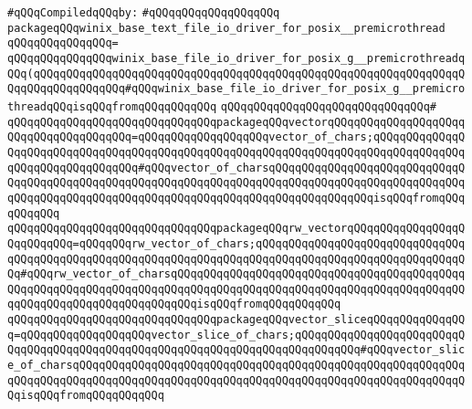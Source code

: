 \newline
\verb|#qQQqCompiledqQQqby:|\newline
\verb|#qQQqqQQqqQQqqQQqqQQq|\newline
\newline
\verb|packageqQQqwinix_base_text_file_io_driver_for_posix__premicrothread|\newline
\verb|qQQqqQQqqQQqqQQq=|\newline
\verb|qQQqqQQqqQQqqQQqwinix_base_file_io_driver_for_posix_g__premicrothreadqQQq(qQQqqQQqqQQqqQQqqQQqqQQqqQQqqQQqqQQqqQQqqQQqqQQqqQQqqQQqqQQqqQQqqQQqqQQqqQQqqQQqqQQq#qQQqwinix_base_file_io_driver_for_posix_g__premicrothreadqQQqisqQQqfromqQQqqQQqqQQq|\newline
\verb|qQQqqQQqqQQqqQQqqQQqqQQqqQQqqQQq#|\newline
\verb|qQQqqQQqqQQqqQQqqQQqqQQqqQQqqQQqpackageqQQqvectorqQQqqQQqqQQqqQQqqQQqqQQqqQQqqQQqqQQqqQQq=qQQqqQQqqQQqqQQqqQQqvector_of_chars;qQQqqQQqqQQqqQQqqQQqqQQqqQQqqQQqqQQqqQQqqQQqqQQqqQQqqQQqqQQqqQQqqQQqqQQqqQQqqQQqqQQqqQQqqQQqqQQqqQQqqQQq#qQQqvector_of_charsqQQqqQQqqQQqqQQqqQQqqQQqqQQqqQQqqQQqqQQqqQQqqQQqqQQqqQQqqQQqqQQqqQQqqQQqqQQqqQQqqQQqqQQqqQQqqQQqqQQqqQQqqQQqqQQqqQQqqQQqqQQqqQQqqQQqqQQqqQQqqQQqqQQqqQQqqQQqisqQQqfromqQQqqQQqqQQq|\newline
\verb|qQQqqQQqqQQqqQQqqQQqqQQqqQQqqQQqpackageqQQqrw_vectorqQQqqQQqqQQqqQQqqQQqqQQqqQQq=qQQqqQQqrw_vector_of_chars;qQQqqQQqqQQqqQQqqQQqqQQqqQQqqQQqqQQqqQQqqQQqqQQqqQQqqQQqqQQqqQQqqQQqqQQqqQQqqQQqqQQqqQQqqQQqqQQqqQQqqQQq#qQQqrw_vector_of_charsqQQqqQQqqQQqqQQqqQQqqQQqqQQqqQQqqQQqqQQqqQQqqQQqqQQqqQQqqQQqqQQqqQQqqQQqqQQqqQQqqQQqqQQqqQQqqQQqqQQqqQQqqQQqqQQqqQQqqQQqqQQqqQQqqQQqqQQqqQQqqQQqisqQQqfromqQQqqQQqqQQq|\newline
\verb|qQQqqQQqqQQqqQQqqQQqqQQqqQQqqQQqpackageqQQqvector_sliceqQQqqQQqqQQqqQQq=qQQqqQQqqQQqqQQqqQQqvector_slice_of_chars;qQQqqQQqqQQqqQQqqQQqqQQqqQQqqQQqqQQqqQQqqQQqqQQqqQQqqQQqqQQqqQQqqQQqqQQqqQQqqQQq#qQQqvector_slice_of_charsqQQqqQQqqQQqqQQqqQQqqQQqqQQqqQQqqQQqqQQqqQQqqQQqqQQqqQQqqQQqqQQqqQQqqQQqqQQqqQQqqQQqqQQqqQQqqQQqqQQqqQQqqQQqqQQqqQQqqQQqqQQqqQQqqQQqisqQQqfromqQQqqQQqqQQq|\newline
